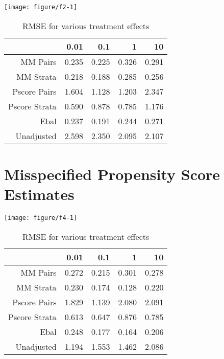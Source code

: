\documentclass[11pt]{article}\usepackage[]{graphicx}\usepackage[]{color}
\makeatletter
\def\maxwidth{ %
  \ifdim\Gin@nat@width>\linewidth
    \linewidth
  \else
    \Gin@nat@width
  \fi
}
\newenvironment{knitrout}{}{} %
\makeatother
\begin{document}
\begin{knitrout}
\color{fgcolor}

{\centering \texttt{[image: figure/f2-1]} 

}



\end{knitrout}
\begin{table}[ht]
\centering
\begin{tabular}{rrrrr}
  \hline
 & 0.01 & 0.1 & 1 & 10 \\ 
  \hline
MM Pairs & 0.235 & 0.225 & 0.326 & 0.291 \\ 
  MM Strata & 0.218 & 0.188 & 0.285 & 0.256 \\ 
  Pscore Pairs & 1.604 & 1.128 & 1.203 & 2.347 \\ 
  Pscore Strata & 0.590 & 0.878 & 0.785 & 1.176 \\ 
  Ebal & 0.237 & 0.191 & 0.244 & 0.271 \\ 
  Unadjusted & 2.598 & 2.350 & 2.095 & 2.107 \\ 
   \hline
\end{tabular}
\caption{RMSE for various treatment effects} 
\label{tab:f2}
\end{table}






\section{Misspecified Propensity Score Estimates}
\begin{knitrout}
\color{fgcolor}

{\centering \texttt{[image: figure/f4-1]} 

}



\end{knitrout}
\begin{table}[ht]
\centering
\begin{tabular}{rrrrr}
  \hline
 & 0.01 & 0.1 & 1 & 10 \\ 
  \hline
MM Pairs & 0.272 & 0.215 & 0.301 & 0.278 \\ 
  MM Strata & 0.230 & 0.174 & 0.128 & 0.220 \\ 
  Pscore Pairs & 1.829 & 1.139 & 2.080 & 2.091 \\ 
  Pscore Strata & 0.613 & 0.647 & 0.876 & 0.785 \\ 
  Ebal & 0.248 & 0.177 & 0.164 & 0.206 \\ 
  Unadjusted & 1.194 & 1.553 & 1.462 & 2.086 \\ 
   \hline
\end{tabular}
\caption{RMSE for various treatment effects} 
\label{tab:f4}
\end{table}
\end{document}
